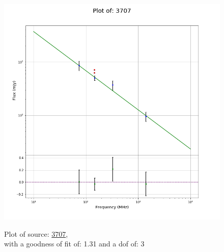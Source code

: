 \documentclass{article}
\begin{document}
\begin{figure}[H]
\begin{minipage}{0.5\textwidth}
        \includegraphics[scale = 0.35]{KmeulenSimSource_1hr/1hr3707.png}
        \captionsetup{labelformat=empty}
        \caption{Plot of source: \href{http://banana.transientskp.org/r4/vlo_KmeulenSimSource/runningcatalog/3707}{3707},\\with a goodness of fit of: 1.31 and a dof of: 3}
    \addtocounter{figure}{-1}
    \label{KmeulenSimSource:1hr:3707:plot}
    \end{minipage}
\end{figure}
\end{document}
